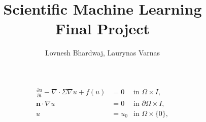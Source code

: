 \documentclass[unicode,11pt,a4paper,oneside,numbers=endperiod,openany]{article}
\title{Scientific Machine Learning \\ Final Project}
\author{Lovnesh Bhardwaj, Laurynas Varnas}
\date{}
\begin{document}
\maketitle

\begin{align*}
	\frac{\partial u}{\partial t} - \nabla \cdot \Sigma \nabla u + f(u) & = 0   & \text{in } \Omega \times I,          \\
	\mathbf{n} \cdot \nabla u                                           & = 0   & \text{in } \partial \Omega \times I, \\
	u                                                                   & = u_0 & \text{in } \Omega \times \{0\},
\end{align*}

\nocite{*}


\end{document}
